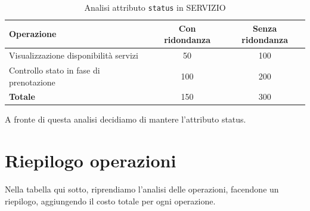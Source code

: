 \documentclass[a4paper,12pt]{report}
\begin{document}
\begin{table}[H]
	\centering
	\begin{tabular}{|l|c|c|}
		\hline
		\textbf{Operazione}                     & \textbf{Con ridondanza} & \textbf{Senza ridondanza} \\
		\hline
		Visualizzazione disponibilità servizi   & 50                      & 100                       \\
		Controllo stato in fase di prenotazione & 100                     & 200                       \\
		\hline
		\textbf{Totale}                         & 150                     & 300                       \\
		\hline
	\end{tabular}
	\caption{Analisi attributo \texttt{status} in SERVIZIO}
\end{table}

A fronte di questa analisi decidiamo di mantere l'attributo status.

\section{Riepilogo operazioni}
Nella tabella qui sotto, riprendiamo l'analisi delle operazioni, facendone un riepilogo, aggiungendo
il costo totale per ogni operazione.
\end{document}
